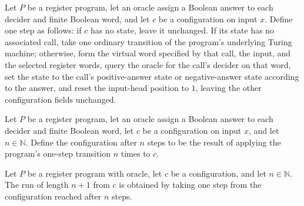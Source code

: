 \begin{definition}
\label{Complexity.LogProg.rstep}
\leanok
{}
Let $P$ be a register program, let an oracle assign a Boolean answer to each decider and
finite Boolean word, and let $c$ be a configuration on input $x$. Define one step as
follows: if $c$ has no state, leave it unchanged. If its state has no associated call,
take one ordinary transition of the program's underlying Turing machine; otherwise, form
the virtual word specified by that call, the input, and the selected register words,
query the oracle for the call's decider on that word, set the state to the call's
positive-answer state or negative-answer state according to the answer, and reset the
input-head position to $1$, leaving the other configuration fields unchanged.
\end{definition}

\begin{definition}
\label{Complexity.LogProg.rrun}
\leanok
{}
Let $P$ be a register program, let an oracle assign a Boolean answer to each decider and
finite Boolean word, let $c$ be a configuration on input $x$, and let $n\in\mathbb{N}$.
Define the configuration after $n$ steps to be the result of applying the program's
one-step transition $n$ times to $c$.
\end{definition}

\begin{lemma}
\label{Complexity.LogProg.rrun_succ}
\leanok
{}
Let $P$ be a register program with oracle, let $c$ be a configuration, and let
$n\in\mathbb N$. The run of length $n+1$ from $c$ is obtained by taking one step from
the configuration reached after $n$ steps.
\end{lemma}

